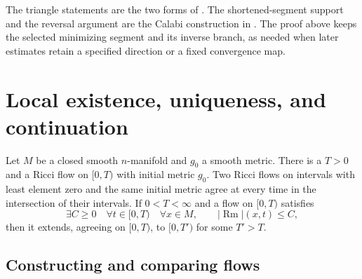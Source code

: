 The triangle statements are the two forms of
\cite[Theorem 2.4, p. 23]{MT2007}.  The shortened-segment
support and the reversal argument are the Calabi construction
in \cite[Lemma 7.1.9, pp. 284--285]{Petersen2016}.
The proof above keeps the selected minimizing segment and
its inverse branch, as needed when later estimates retain
a specified direction or a fixed convergence map.

\section{Local existence, uniqueness, and continuation}
\label{sec:rf-local}

\begin{theorem}\label{thm:rf-local}
Let $M$ be a closed smooth $n$-manifold and $g_0$ a smooth metric.
There is a $T>0$ and a Ricci flow on $[0,T)$ with initial metric $g_0$.
Two Ricci flows on intervals with least element zero and the same initial
metric agree at every time in the intersection of their intervals.
If $0<T<\infty$ and a flow on $[0,T)$ satisfies
\[
 \exists C\geq0\quad\forall t\in[0,T)\quad\forall x\in M,\qquad
                       |\operatorname{Rm}|(x,t)\leq C,
\]
then it extends, agreeing on $[0,T)$, to $[0,T')$ for some $T'>T$.
\end{theorem}

\subsection{Constructing and comparing flows}

